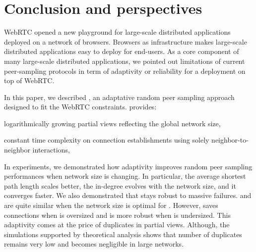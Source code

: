 
\section{Conclusion and perspectives}
\label{sec:conclusion}

WebRTC opened a new playground for large-scale distributed
applications deployed on a network of browsers. Browsers as
infrastructure makes large-scale distributed applications easy to
deploy for end-users. As a core component of many large-scale
distributed applications, we pointed out limitations of current
peer-sampling protocols in term of adaptivity or reliability for a
deployment on top of WebRTC. 

In this paper, we described \SPRAY, an adaptative random peer sampling
approach designed to fit the WebRTC constraints.  \SPRAY provides:
\begin{inparaenum}[(i)]
\item logarithmically growing partial views reflecting the global network size,
\item constant time complexity on connection establishments using solely
  neighbor-to-neighbor interactions,
\end{inparaenum}

In experiments, we demonstrated how \SPRAY adaptivity improves random
peer sampling performances when network size is changing. In
particular, the average shortest path length scales better, the
in-degree evolves with the network size, and it converges faster.  We
also demonstrated that \SPRAY stays robust to massive failures. \SPRAY
and \CYCLON are quite similar when the network size is optimal for
\CYCLON. However, \SPRAY saves connections when \CYCLON is oversized
and is more robust when \CYCLON is undersized. This adaptivity comes
at the price of duplicates in partial views. Although, the simulations
supported by theoretical analysis shows that number of duplicates remains very low and becomes negligible in large networks.




